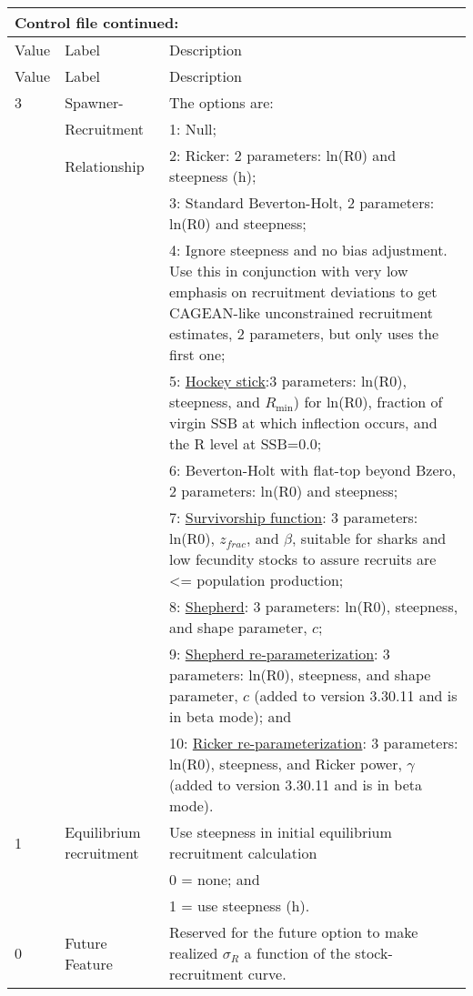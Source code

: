 \begin{longtable}{p{1cm} p{3cm} p{11cm}}
	\multicolumn{3}{l}{Control file continued:}\\
	\hline
	Value & Label &  Description\Tstrut\Bstrut\\
	\hline
	\endfirsthead

	\hline
	Value & Label &  Description\Tstrut\Bstrut\\
	\hline
	\endhead
	\hline
	\endfoot
	\endlastfoot

	3 & Spawner-            & The options are: \Tstrut\\
	  & Recruitment         & 1: Null; \\
	  & Relationship        & 2: Ricker: 2 parameters: ln(R0) and steepness (h); \\
	  &                     & 3: Standard Beverton-Holt, 2 parameters: ln(R0) and steepness; \\
	  &                     & 4: Ignore steepness and no bias adjustment.  Use this in conjunction with very low emphasis on recruitment deviations to get CAGEAN-like unconstrained recruitment estimates, 2 parameters, but only uses the first one;\\
	  &                     & 5: \hyperlink{Hockey}{Hockey stick}:3 parameters: ln(R0), steepness, and $R_{\text{min}}$) for ln(R0), fraction of virgin SSB at which inflection occurs, and the R level at SSB=0.0; \\
	  &                     & 6: Beverton-Holt with flat-top beyond Bzero, 2 parameters: ln(R0) and steepness;\\
	  &                     & 7: \hyperlink{Survivorship}{Survivorship function}: 3 parameters: ln(R0), $z_{frac}$, and $\beta$, suitable for sharks and low fecundity stocks to assure recruits are <= population production;\\
      &                     & 8: \hyperlink{Shepherd}{Shepherd}: 3 parameters: ln(R0), steepness, and shape parameter, $c$;\\
      & 					& 9: \hyperlink{Shepherd2}{Shepherd re-parameterization}: 3 parameters: ln(R0), steepness, and shape parameter, $c$ (added to version 3.30.11 and is in beta mode); and\\
      & 					& 10: \hyperlink{Ricker2}{Ricker re-parameterization}: 3 parameters: ln(R0), steepness, and Ricker power, $\gamma$ (added to version 3.30.11 and is in beta mode).\Bstrut\\
    \hline

    1 \Tstrut & Equilibrium recruitment & Use steepness in initial equilibrium recruitment calculation \\
      & 						& 0 = none; and \\
      &							& 1 = use steepness (h). \\
    0 &  Future Feature         & Reserved for the future option to make realized $\sigma_R$ a function of the stock-recruitment curve.\Bstrut\\ 
    \hline
\end{longtable}

